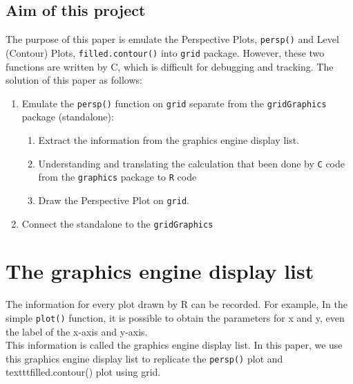 \documentclass[paper=a4, fontsize=11pt]{report}
\begin{document}
\section{Aim of this project}
The purpose of this paper is emulate the Perspective Plots, \texttt{persp()} and Level (Contour) Plots, \texttt{filled.contour()} into \texttt{grid} package. However, these two functions are written by C, which is difficult for debugging and tracking. The solution of this paper as follows: 
\begin{enumerate}
  \item Emulate the \texttt{persp()} function on \texttt{grid} separate from the \texttt{gridGraphics} package (standalone):
    \begin{enumerate}
      \item Extract the information from the graphics engine display list.
      \item Understanding and translating the calculation that been done by \texttt{C} code from the \texttt{graphics} package to \texttt{R} code
      \item Draw the Perspective Plot on \texttt{grid}.
    \end{enumerate}
  \item Connect the standalone to the \texttt{gridGraphics}
\end{enumerate}





\chapter{The graphics engine display list}
The information for every plot drawn by R can be recorded. For example, In the simple \texttt{plot()} function, it is possible to obtain the parameters for x and y, even the label of the x-axis and y-axis.\\

This information is called the graphics engine display list. In this paper, we use this graphics engine display list to replicate the \texttt{persp()} plot and texttt{filled.contour()} plot using grid.\\
\end{document}

